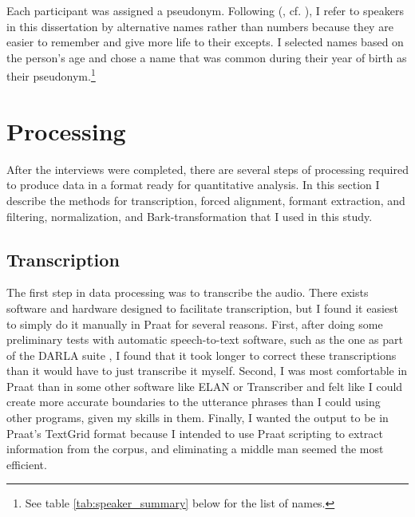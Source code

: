 Each participant was assigned a pseudonym. Following \citeauthor{tagliamonte_2006} (\citeyear[51]{tagliamonte_2006}, cf. \citealt[253--254]{schlling_2013}), I refer to speakers in this dissertation by alternative names rather than numbers because they are easier to remember and give more life to their excepts. I selected names based on the person’s age and chose a name that was common during their year of birth as their pseudonym.\footnote{See table \ref{tab:speaker_summary} below for the list of names.}




\section{Processing}
\label{processing}

After the interviews were completed, there are several steps of processing required to produce data in a format ready for quantitative analysis. In this section I describe the methods for transcription, forced alignment, formant extraction, and filtering, normalization, and Bark-transformation that I used in this study.

\subsection{Transcription}
\label{transcription}

The first step in data processing was to transcribe the audio. There exists software and hardware designed to facilitate transcription, but I found it easiest to simply do it manually in Praat \citep{boersma_weenink_2018_praat} for several reasons. First, after doing some preliminary tests with automatic speech-to-text software, such as the one as part of the DARLA suite \citep{reddy_stanford_2015_DARLA}, I found that it took longer to correct these transcriptions than it would have to just transcribe it myself. Second, I was most comfortable in Praat than in some other software like ELAN or Transcriber and felt like I could create more accurate boundaries to the utterance phrases than I could using other programs, given my skills in them. Finally, I wanted the output to be in Praat’s TextGrid format because I intended to use Praat scripting to extract information from the corpus, and eliminating a middle man seemed the most efficient.

